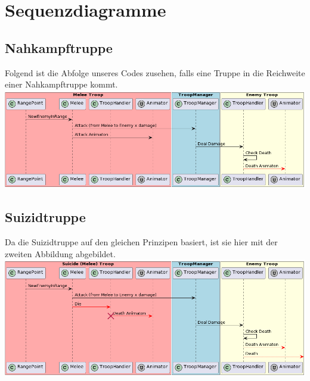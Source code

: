 \section{Sequenzdiagramme}
\subsection{Nahkampftruppe}
Folgend ist die Abfolge unseres Codes zusehen, falls eine Truppe in die Reichweite einer Nahkampftruppe kommt.\\
\includegraphics[width=15cm]{resources/MeleeAttacks.png} \\
\subsection{Suizidtruppe}
Da die Suizidtruppe auf den gleichen Prinzipen basiert, ist sie hier mit der zweiten Abbildung abgebildet. \\
\includegraphics[width=15cm]{resources/SuicideAttacks.png} \\

